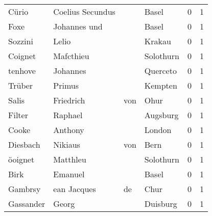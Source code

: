 \begin{tabular}{llllrr}
                    Cürio &                   Coelius Secundus &             &                                       Basel &          0 &         1 \\
                     Foxe &                       Johannes und &             &                                       Basel &          0 &         1 \\
                  Sozzini &                              Lelio &             &                                      Krakau &          0 &         1 \\
                  Coignet &                          Mafcthieu &             &                                   Solothurn &          0 &         1 \\
                  tenhove &                           Johannes &             &                                    Querceto &          0 &         1 \\
                   Trüber &                             Primus &             &                                     Kempten &          0 &         1 \\
                    Salis &                          Friedrich &         von &                                        Ohur &          0 &         1 \\
                   Filter &                            Raphael &             &                                    Augsburg &          0 &         1 \\
                    Cooke &                            Anthony &             &                                      London &          0 &         1 \\
                 Diesbach &                            Nikiaus &         von &                                        Bern &          0 &         1 \\
                  öoignet &                           Matthleu &             &                                   Solothurn &          0 &         1 \\
                     Birk &                            Emanuel &             &                                       Basel &          0 &         1 \\
                  Gambrsy &                        ean Jacques &          de &                                        Chur &          0 &         1 \\
                Gassander &                              Georg &             &                                    Duisburg &          0 &         1 \\

\end{tabular}
